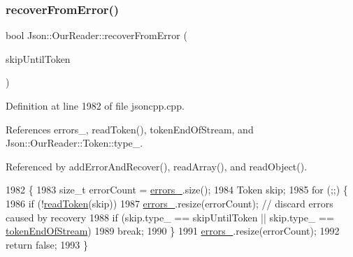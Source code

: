 \subsubsection{\texorpdfstring{recover\+From\+Error()}{recoverFromError()}}
{\footnotesize\ttfamily bool Json\+::\+Our\+Reader\+::recover\+From\+Error (\begin{DoxyParamCaption}\item[{\hyperlink{class_json_1_1_our_reader_a15116f7276ddf1e7a2cc3cbefa884dcc}{Token\+Type}}]{skip\+Until\+Token }\end{DoxyParamCaption})\hspace{0.3cm}{\ttfamily [private]}}



Definition at line 1982 of file jsoncpp.\+cpp.



References errors\+\_\+, read\+Token(), token\+End\+Of\+Stream, and Json\+::\+Our\+Reader\+::\+Token\+::type\+\_\+.



Referenced by add\+Error\+And\+Recover(), read\+Array(), and read\+Object().


\begin{DoxyCode}
1982                                                          \{
1983   \textcolor{keywordtype}{size\_t} errorCount = \hyperlink{class_json_1_1_our_reader_afb76b68ba1ab68fe09cf2838e3d4898d}{errors\_}.size();
1984   Token skip;
1985   \textcolor{keywordflow}{for} (;;) \{
1986     \textcolor{keywordflow}{if} (!\hyperlink{class_json_1_1_our_reader_a0d1e66da47fe2e85f5033c59326dfdc3}{readToken}(skip))
1987       \hyperlink{class_json_1_1_our_reader_afb76b68ba1ab68fe09cf2838e3d4898d}{errors\_}.resize(errorCount); \textcolor{comment}{// discard errors caused by recovery}
1988     \textcolor{keywordflow}{if} (skip.type\_ == skipUntilToken || skip.type\_ == \hyperlink{class_json_1_1_our_reader_a15116f7276ddf1e7a2cc3cbefa884dcca735d1f76eafc2c0c581ed79c077aaa7e}{tokenEndOfStream})
1989       \textcolor{keywordflow}{break};
1990   \}
1991   \hyperlink{class_json_1_1_our_reader_afb76b68ba1ab68fe09cf2838e3d4898d}{errors\_}.resize(errorCount);
1992   \textcolor{keywordflow}{return} \textcolor{keyword}{false};
1993 \}
\end{DoxyCode}
\mbox{\label{class_json_1_1_our_reader_a856dea44d92578c276856d7a65a4ebdc}} 
